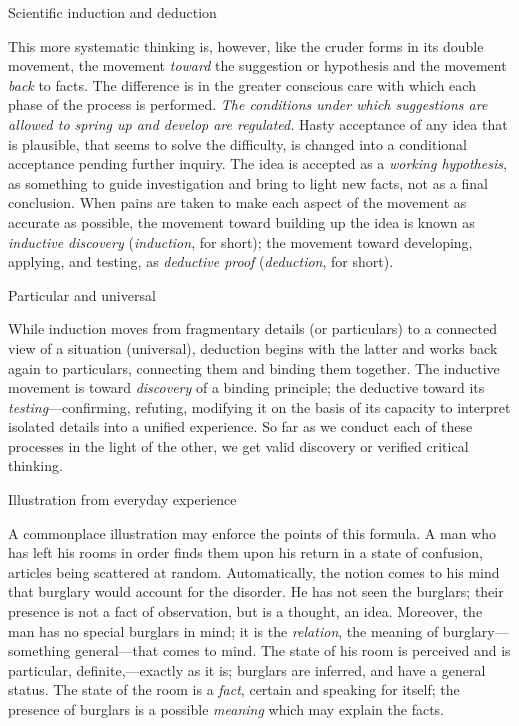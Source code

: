 \documentclass[letterpaper]{book}
\begin{document}
Scientific induction and deduction

This more systematic thinking is, however, like the cruder forms in its
double movement, the movement \emph{toward} the suggestion or hypothesis
and the movement \emph{back} to facts. The difference is in the greater
conscious care with which each phase of the process is performed.
\emph{The conditions under which suggestions are allowed to spring up
and develop are regulated.} Hasty acceptance of any idea that is
plausible, that seems to solve the difficulty, is changed into a
conditional acceptance pending further inquiry. The idea is accepted as
a \emph{working hypothesis}, as something to guide investigation and
bring to light new facts, not as a final conclusion. When pains are
taken to make each aspect of the movement as accurate as possible, the
movement toward building up the idea is known as \emph{inductive
discovery} (\emph{induction}, for short); the movement toward
developing, applying, and testing, as \emph{deductive proof}
(\emph{deduction}, for short).

Particular and universal

While induction moves from fragmentary details
(or
particulars) to a connected view of a situation (universal), deduction
begins with the latter and works back again to particulars, connecting
them and binding them together. The inductive movement is toward
\emph{discovery} of a binding principle; the deductive toward its
\emph{testing}---confirming, refuting, modifying it on the basis of its
capacity to interpret isolated details into a unified experience. So far
as we conduct each of these processes in the light of the other, we get
valid discovery or verified critical thinking.

Illustration from everyday experience

A commonplace illustration may enforce the points of this formula. A man
who has left his rooms in order finds them upon his return in a state of
confusion, articles being scattered at random. Automatically, the notion
comes to his mind that burglary would account for the disorder. He has
not seen the burglars; their presence is not a fact of observation, but
is a thought, an idea. Moreover, the man has no special burglars in
mind; it is the \emph{relation}, the meaning of burglary---something
general---that comes to mind. The state of his room is perceived and is
particular, definite,---exactly as it is; burglars are inferred, and
have a general status. The state of the room is a \emph{fact}, certain
and speaking for itself; the presence of burglars is a possible
\emph{meaning} which may explain the facts.
\end{document}
